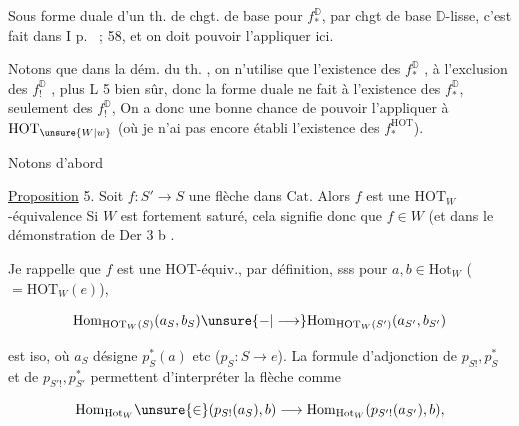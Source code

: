 
Sous forme duale d'un th. de chgt. de base pour $f_*^{\mathbb D}$, par chgt de base $\mathbb D$-lisse, c'est fait dans I p.~ ; 58, et on doit pouvoir l'appliquer ici.

 Notons que dans la dém. du th. , on n'utilise que l'existence des $f_*^{\mathbb D}$ , à l'exclusion des $f_!^{\mathbb D}$ , plus L 5 bien sûr, donc la forme duale ne  fait  à l'existence des $f_*^{\mathbb D}$, seulement des $f_!^{\mathbb D}$, On a donc une bonne chance de pouvoir l'appliquer à $\mathrm{HOT}_{\unsure{W|w}}$ (où je n'ai pas encore établi l'existence des $f_*^{\mathrm{HOT}}$).

Notons d'abord


\uline{Proposition} 5. Soit $f:S'\longrightarrow S$ une flèche dans $\mathrm{Cat}$. Alors $f$ est une $\mathrm{HOT}_W$-équivalence    Si $W$ est fortement saturé, cela signifie donc que  $f\in W$ (et \unsure{$=$}   dans le \unsure{$+$} démonstration de Der 3 b .


Je rappelle que $f$ est une $\mathrm{HOT}$-équiv., par définition, sss pour  $a,b\in\mathrm{Hot}_W$ ($=\mathrm{HOT}_W(e)$),

\[
 \mathrm{Hom}_{\mathrm{HOT}_W(S)}(a_S,b_S)\unsure{\mathord{-}|\longrightarrow}
 \mathrm{Hom}_{\mathrm{HOT}_W(S')}(a_{S'},b_{S'})
\]

est iso, où $a_S$  désigne $p_S^*(a)$ etc ($p_S:S\longrightarrow e$). La formule d'adjonction de $p_{S!},p_S^*$ et de $p_{S'!},p_{S'}^*$ permettent d'interpréter la flèche  comme

\[
 \mathrm{Hom}_{\mathrm{Hot}_W}\unsure{\in}(p_{S!}(a_S),b)\longrightarrow
 \mathrm{Hom}_{\mathrm{Hot}_W}(p_{S'!}(a_{S'}),b),
\]

